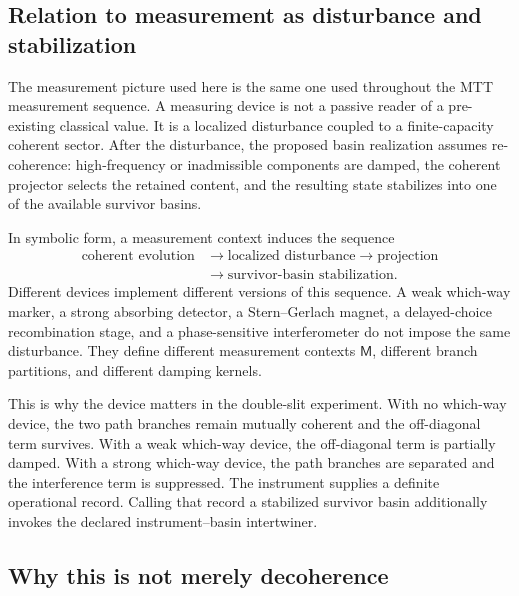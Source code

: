 \documentclass[11pt]{article}
\newcommand{\Meas}{\mathsf M}
\begin{document}
\subsection{Relation to measurement as disturbance and stabilization}
\label{subsec:disturbance-relation}

The measurement picture used here is the same one used throughout the MTT measurement
sequence. A measuring device is not a passive reader of a pre-existing classical value. It is a
localized disturbance coupled to a finite-capacity coherent sector. After the disturbance, the
proposed basin realization assumes re-coherence: high-frequency or inadmissible components are damped, the
coherent projector selects the retained content, and the resulting state stabilizes into one of
the available survivor basins.

In symbolic form, a measurement context induces the sequence
\begin{equation}
  \begin{aligned}
  \text{coherent evolution}
  &\longrightarrow \text{localized disturbance}
  \longrightarrow \text{projection}\\
  &\longrightarrow \text{survivor-basin stabilization}.
  \end{aligned}
  \label{eq:evolve-project-stabilize-purpose}
\end{equation}
Different devices implement different versions of this sequence. A weak which-way marker,
a strong absorbing detector, a Stern--Gerlach magnet, a delayed-choice recombination stage,
and a phase-sensitive interferometer do not impose the same disturbance. They define different
measurement contexts \(\Meas\), different branch partitions, and different damping kernels.

This is why the device matters in the double-slit experiment. With no which-way device,
the two path branches remain mutually coherent and the off-diagonal term survives. With a
weak which-way device, the off-diagonal term is partially damped. With a strong which-way
device, the path branches are separated and the interference term is suppressed. The
instrument supplies a definite operational record. Calling that record a stabilized survivor
basin additionally invokes the declared instrument--basin intertwiner.

\subsection{Why this is not merely decoherence}
\label{subsec:not-merely-decoherence}
\end{document}
